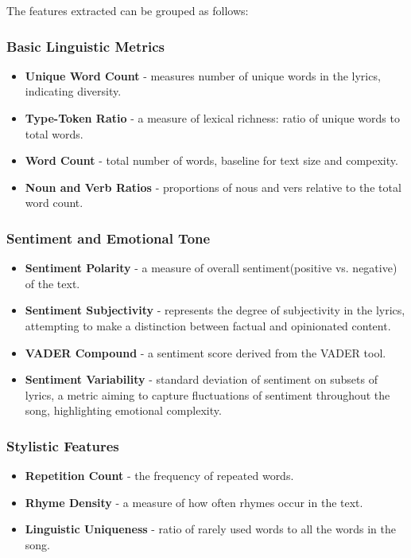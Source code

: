 The features extracted can be grouped as follows:

\subsubsection*{Basic Linguistic Metrics}
\begin{itemize}
  \item \textbf{Unique Word Count} - measures number of unique words in the
    lyrics, indicating diversity.
  \item \textbf{Type-Token Ratio} - a measure of lexical richness: ratio of
    unique words to total words.
  \item \textbf{Word Count} - total  number of words, baseline for text size
    and compexity.
  \item \textbf{Noun and Verb Ratios} - proportions of nous and vers relative
    to the total word count.
\end{itemize}


\subsubsection*{Sentiment and Emotional Tone}
\begin{itemize}
  \item \textbf{Sentiment Polarity} - a measure of overall sentiment(positive
    vs. negative) of the text.
  \item \textbf{Sentiment Subjectivity} - represents the degree of subjectivity
    in the lyrics, attempting to make a distinction between factual and
    opinionated content.
  \item \textbf{VADER Compound} - a sentiment score derived from the VADER
    tool.
  \item \textbf{Sentiment Variability} - standard deviation of sentiment on
    subsets of lyrics, a metric  aiming to capture fluctuations of sentiment
    throughout the song, highlighting emotional complexity.
\end{itemize}


\subsubsection*{Stylistic Features}
\begin{itemize}
  \item \textbf{Repetition Count} - the frequency of repeated words.
  \item \textbf{Rhyme Density} - a measure of how often rhymes occur in the
    text.
  \item \textbf{Linguistic Uniqueness} - ratio of rarely used words to all the
    words in the song.
\end{itemize}


